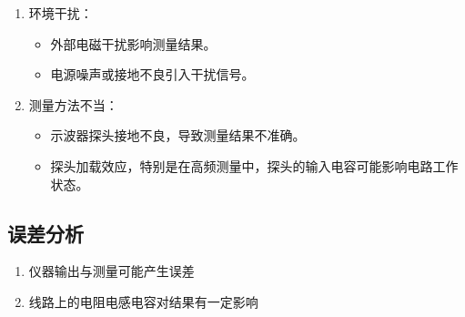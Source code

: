 \documentclass[a4paper,utf8]{article}
\begin{document}
\begin{enumerate}
        \item 环境干扰：
        \begin{itemize}
        \item 外部电磁干扰影响测量结果。
        \item 电源噪声或接地不良引入干扰信号。
        \end{itemize}
        
        \item 测量方法不当：
        \begin{itemize}
        \item 示波器探头接地不良，导致测量结果不准确。
        \item 探头加载效应，特别是在高频测量中，探头的输入电容可能影响电路工作状态。
        \end{itemize}
    \end{enumerate}
    \subsection{误差分析}
        \begin{enumerate}
            \item 仪器输出与测量可能产生误差
            \item 线路上的电阻电感电容对结果有一定影响
        \end{enumerate}
\end{document}
